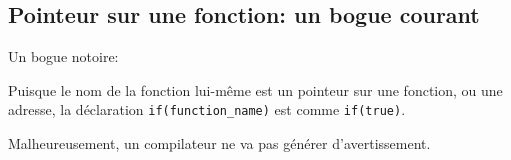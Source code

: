 \subsection{Pointeur sur une fonction: un bogue courant}

Un bogue notoire:



Puisque le nom de la fonction lui-même est un pointeur sur une fonction, ou une
adresse, la déclaration \verb|if(function_name)| est comme \verb|if(true)|.

Malheureusement, un compilateur \CCpp ne va pas générer d'avertissement.


